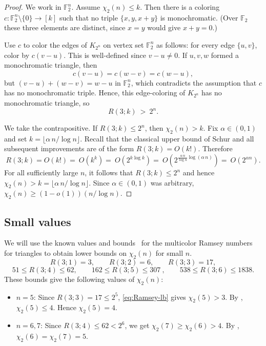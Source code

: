 \documentclass[11pt]{article}
\theoremstyle{plain}
\newcommand{\F}{\mathbb{F}}
\begin{document}
\begin{proof}
We work in $\F_2^n$. 
Assume $\chi_2(n)\le k$. Then there is a coloring $c:\F_2^n\setminus\{0\}\to[k]$ such that no triple $\{x,y,x+y\}$ is monochromatic.
(Over $\F_2$ these three elements are distinct, since $x=y$ would give $x+y=0$.)

Use $c$ to color the edges of $K_{2^n}$ on vertex set $\F_2^n$ as follows:
for every edge $\{u,v\}$, color by $c(v-u)$.
This is well-defined since $v-u\neq 0$.
If $u,v,w$ formed a monochromatic triangle, then
\[
c(v-u)=c(w-v)=c(w-u),
\]
but $(v-u)+(w-v)=w-u$ in $\F_2^n$, which contradicts the assumption that $c$ has no monochromatic triple. 
Hence, this edge-coloring of $K_{2^n}$ has no monochromatic triangle, so
\begin{equation}\label{eq:Ramsey-lb}
R(3;k)\ >\ 2^n.
\end{equation}

We take the contrapositive.
If $R(3;k)\le 2^n$, then $\chi_2(n)>k$.
Fix $\alpha\in(0,1)$ and set $k=\big\lfloor \alpha\,n/\log n\big\rfloor$.
Recall that the classical upper bound of Schur and all subsequent improvements are of the form $R(3;k)=O(k!)$. Therefore
\[
R(3;k) = O(k!) =\ O(k^k) =\ O(2^{k\log k}) =\ O\left(2^{ \tfrac{\alpha\,n}{\log n} \log(\alpha\,n)}\right) =\ O(2^{\alpha n}) .
\]
For all sufficiently large $n$, it follows that $R(3;k) \le 2^n$ and hence $\chi_2(n)>k = \lfloor \alpha\,n/\log n \rfloor$. 
Since $\alpha\in(0,1)$ was arbitrary, $\chi_2(n)\ge(1 - o(1))(n/\log n)$.
\end{proof}

\subsection{Small values}\label{subsec:small-n}
We will use the known values and bounds~\cite{RadziszowskiSurvey2017} for the multicolor Ramsey numbers for triangles to obtain lower bounds on $\chi_2(n)$ for small $n$.
\[
R(3;1)=3,\qquad R(3;2)=6,\qquad R(3;3)=17,
\]
\[
51 \le R(3;4) \le 62,\qquad
162 \le R(3;5) \le 307 \ ,\qquad
538 \le R(3;6) \le 1838.
\]
These bounds give the following values of $\chi_2(n)$:
\begin{itemize}
  \item $n=5$: Since $R(3;3)=17\le 2^5$, \cref{eq:Ramsey-lb} gives $\chi_2(5)>3$. By , $\chi_2(5)\le 4$. Hence $\chi_2(5)=4$.
  \item $n=6,7$: Since $R(3;4)\leq 62< 2^6$, we get $\chi_2(7)\geq \chi_2(6)>4$. By , $\chi_2(6) = \chi_2(7) = 5$.
\end{itemize}
\end{document}
